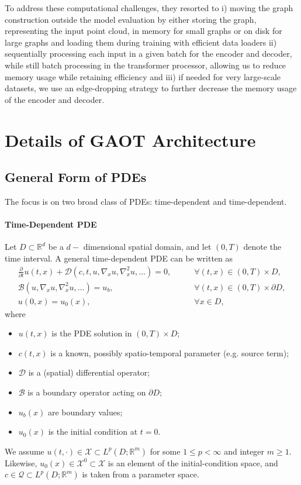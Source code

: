 \documentclass[reqno,10pt]{amsart}
\theoremstyle{plain}
\theoremstyle{definition}
\newcommand{\bb}[1]{\mathbb{#1}}
\newcommand{\cal}[1]{\mathcal{#1}}
\begin{document}
\noindent To address these computational challenges, they resorted to i) moving the graph construction outside the model evaluation by either storing the graph, representing the input point cloud, in memory for small graphs or on disk for large graphs and loading them during training with efficient data loaders ii) sequentially processing each input in a given batch for the encoder and decoder, while still batch processing in the transformer processor, allowing us to reduce memory usage while retaining efficiency and iii) if needed for very large-scale datasets, we use an edge-dropping strategy to further decrease the memory usage of the encoder and decoder.



\appendix
\section{\bf Details of GAOT Architecture}
\subsection{\bf General Form of PDEs} The focus is on two broad class of PDEs: time-dependent and time-dependent.

\paragraph{\bf Time-Dependent PDE} Let $D \subset \bb R^d$ be a $d-$ dimensional spatial domain, and let $(0,T)$ denote the time interval. A general time-dependent PDE can be written as
\begin{equation}
    \begin{aligned} \label{eq:pde_tdep}
        \frac{\partial }{\partial t} u(t,x) + \cal D(c,t,u, \nabla_xu, \nabla^2_x u, \dots) = 0, \qquad &\forall (t,x) \in (0,T) \times D, \\ 
        \cal B(u, \nabla_x u, \nabla_x^2u, \dots) = u_b, \qquad &\forall (t,x) \in (0,T) \times \partial D, \\
        u(0,x) = u_0(x), \qquad &\forall x\in D,
    \end{aligned}
\end{equation}
where
\begin{itemize}
    \item $u(t,x)$ is the PDE solution in $(0,T) \times D$;
    \item $c(t,x)$ is a known, possibly spatio-temporal parameter (e.g. source term);
    \item $\cal D$ is a (spatial) differential operator;
    \item $\cal B$ is a boundary operator acting on $\partial D$;
    \item $u_b(x)$ are boundary values;
    \item $u_0(x)$ is the initial condition at $t=0$.
\end{itemize}
We assume $u(t,\cdot) \in \cal X \subset L^p(D;\bb R^m)$ for some $ 1\leq p < \infty$ and integer $m \geq 1$. Likewise, $u_0(x) \in \cal X^0 \subset \cal X$ is an element of the initial-condition space, and $c\in \cal Q \subset L^p(D;\bb R^m)$ is taken from a parameter space.
\end{document}
